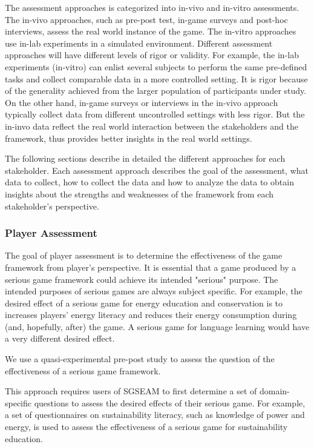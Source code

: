 The assessment approaches is categorized into in-vivo and in-vitro assessments. The in-vivo approaches, 
such as pre-post test, in-game surveys and post-hoc interviews, assess the real world instance of the game. 
The in-vitro approaches use in-lab experiments in a simulated environment. Different assessment
approaches will have different levels of rigor or validity. For example, the in-lab experiments (in-vitro) can 
enlist several subjects to perform the same pre-defined tasks and collect comparable data in a more 
controlled setting. It is rigor because of the generality achieved from the larger population of
participants under study. On the other hand, in-game surveys or interviews in the in-vivo approach typically 
collect data from different uncontrolled settings with less rigor. But the in-invo data reflect the real world 
interaction between the stakeholders and the framework, thus provides better insights in the real world settings.

The following sections describe in detailed the different approaches for each stakeholder.  Each assessment 
approach describes the goal of the assessment, what data to collect, how to collect the data and how to 
analyze the data to obtain insights about the strengths and weaknesses of the framework from each 
stakeholder's perspective.

\subsubsection{Player Assessment}

The goal of player assessment is to determine the effectiveness of the game
framework from player's perspective. It is essential that a game produced by a serious game
framework could achieve its intended "serious" purpose. The intended purposes of serious games are
always subject specific. For example, the desired effect of a serious game for
energy education and conservation is to increases players' energy literacy and
reduces their energy consumption during (and, hopefully, after) the game. A serious game for
language learning would have a very different desired effect.

\label{Pre-Post effectiveness study}

We use a quasi-experimental pre-post study to assess the question of the effectiveness of a serious game framework. 

This approach requires users of SGSEAM to first determine a set of domain-specific questions to assess the 
desired effects of their serious game. For example, a set of questionnaires on sustainability literacy, such as 
knowledge of power and energy, is used to assess the effectiveness of a serious game for sustainability education.

